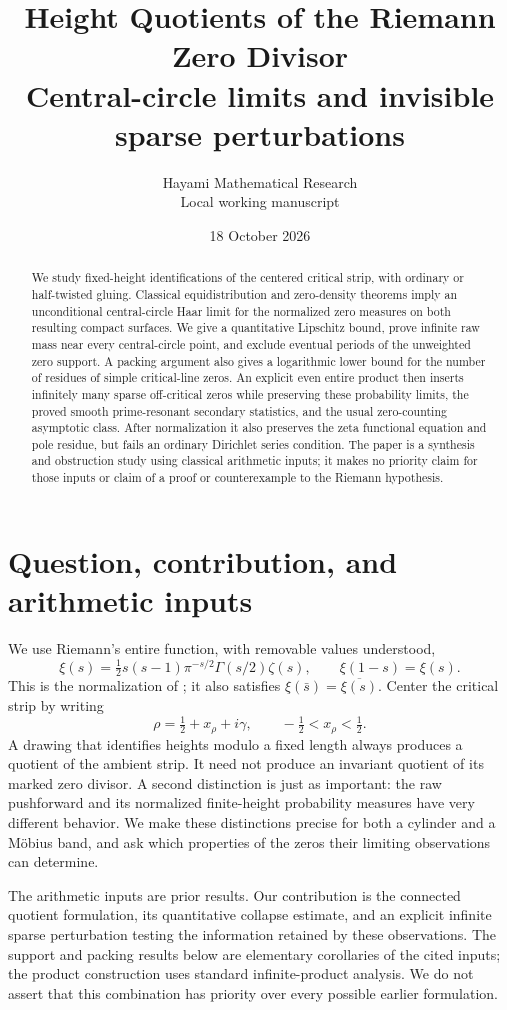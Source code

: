 \documentclass[11pt,a4paper]{article}
\title{Height Quotients of the Riemann Zero Divisor\\[3pt]
\large Central-circle limits and invisible sparse perturbations}
\author{Hayami Mathematical Research\\\small Local working manuscript}
\date{18 October 2026}
\theoremstyle{definition}
\theoremstyle{remark}
\begin{document}
\maketitle
\begin{abstract}
We study fixed-height identifications of the centered critical strip, with
ordinary or half-twisted gluing. Classical equidistribution and zero-density
theorems imply an unconditional central-circle Haar limit for the normalized
zero measures on both resulting compact surfaces. We give a quantitative
Lipschitz bound, prove infinite raw mass near every central-circle point, and
exclude eventual periods of the unweighted zero support. A packing argument
also gives a logarithmic lower bound for the number of residues of simple
critical-line zeros. An explicit even entire product then inserts infinitely
many sparse off-critical zeros while preserving these probability limits,
the proved smooth prime-resonant secondary statistics, and the usual
zero-counting asymptotic class. After normalization it also preserves the
zeta functional equation and pole residue, but fails an ordinary Dirichlet
series condition. The paper is a synthesis and obstruction study using
classical arithmetic inputs; it makes no priority claim for those inputs or
claim of a proof or counterexample to the Riemann hypothesis.
\end{abstract}

\section{Question, contribution, and arithmetic inputs}

We use Riemann's entire function, with removable values understood,
\[
 \xi(s)=\tfrac12s(s-1)\pi^{-s/2}\Gamma(s/2)\zeta(s),
 \qquad \xi(1-s)=\xi(s).
\]
This is the normalization of \cite[25.4.3--25.4.4]{DLMF}; it also satisfies
$\xi(\bar s)=\overline{\xi(s)}$.
Center the critical strip by writing
\[
 \rho=\tfrac12+x_\rho+i\gamma,\qquad -\tfrac12<x_\rho<\tfrac12.
\]
A drawing that identifies heights modulo a fixed length always produces a
quotient of the ambient strip. It need not produce an invariant quotient of
its marked zero divisor. A second distinction is just as important: the raw
pushforward and its normalized finite-height probability measures have very
different behavior. We make these distinctions precise for both a cylinder
and a M\"obius band, and ask which properties of the zeros their limiting
observations can determine.

The arithmetic inputs are prior results. Our contribution is the connected
quotient formulation, its quantitative collapse estimate, and an explicit
infinite sparse perturbation testing the information retained by these
observations. The support and packing results below are elementary corollaries
of the cited inputs; the product construction uses standard infinite-product
analysis. We do not assert that this combination has priority over every
possible earlier formulation.
\end{document}
